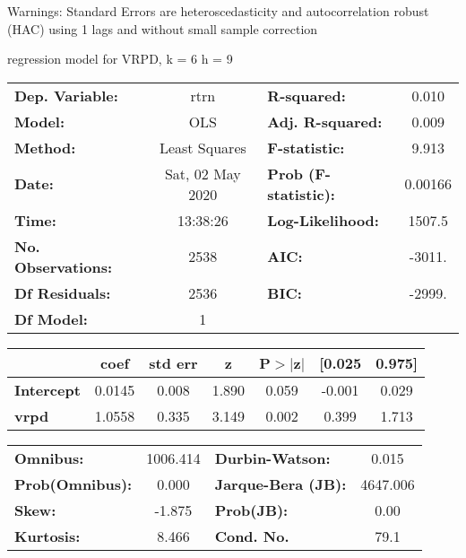 Warnings: \newline
 [1] Standard Errors are heteroscedasticity and autocorrelation robust (HAC) using 1 lags and without small sample correction\ 

regression model for VRPD, k = 6 h = 9\begin{center}
\begin{tabular}{lclc}
\toprule
\textbf{Dep. Variable:}    &       rtrn       & \textbf{  R-squared:         } &     0.010   \\
\textbf{Model:}            &       OLS        & \textbf{  Adj. R-squared:    } &     0.009   \\
\textbf{Method:}           &  Least Squares   & \textbf{  F-statistic:       } &     9.913   \\
\textbf{Date:}             & Sat, 02 May 2020 & \textbf{  Prob (F-statistic):} &  0.00166    \\
\textbf{Time:}             &     13:38:26     & \textbf{  Log-Likelihood:    } &    1507.5   \\
\textbf{No. Observations:} &        2538      & \textbf{  AIC:               } &    -3011.   \\
\textbf{Df Residuals:}     &        2536      & \textbf{  BIC:               } &    -2999.   \\
\textbf{Df Model:}         &           1      & \textbf{                     } &             \\
\bottomrule
\end{tabular}
\begin{tabular}{lcccccc}
                   & \textbf{coef} & \textbf{std err} & \textbf{z} & \textbf{P$> |$z$|$} & \textbf{[0.025} & \textbf{0.975]}  \\
\midrule
\textbf{Intercept} &       0.0145  &        0.008     &     1.890  &         0.059        &       -0.001    &        0.029     \\
\textbf{vrpd}      &       1.0558  &        0.335     &     3.149  &         0.002        &        0.399    &        1.713     \\
\bottomrule
\end{tabular}
\begin{tabular}{lclc}
\textbf{Omnibus:}       & 1006.414 & \textbf{  Durbin-Watson:     } &    0.015  \\
\textbf{Prob(Omnibus):} &   0.000  & \textbf{  Jarque-Bera (JB):  } & 4647.006  \\
\textbf{Skew:}          &  -1.875  & \textbf{  Prob(JB):          } &     0.00  \\
\textbf{Kurtosis:}      &   8.466  & \textbf{  Cond. No.          } &     79.1  \\
\bottomrule
\end{tabular}
\end{center}


